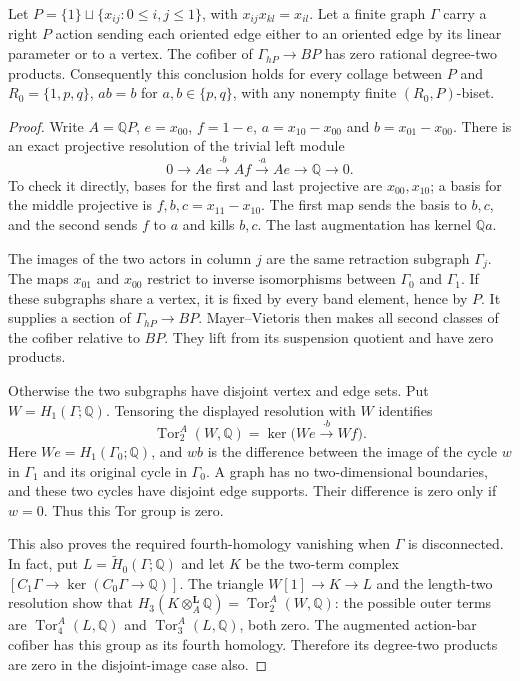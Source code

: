 \begin{lemma}
\label{CP2:A-high-P5-graph}
Let $P=\{1\}\sqcup\{x_{ij}:0\leq i,j\leq1\}$, with
$x_{ij}x_{kl}=x_{il}$.  Let a finite graph $\Gamma$ carry a
right $P$ action sending each oriented edge either to an
oriented edge by its linear parameter or to a vertex.
The cofiber of $\Gamma_{hP}\to BP$ has zero rational
degree-two products.  Consequently this conclusion holds
for every collage between $P$ and
$R_0=\{1,p,q\}$, $ab=b$ for $a,b\in\{p,q\}$,
with any nonempty finite $(R_0,P)$-biset.
\end{lemma}
\begin{proof}
Write $A=\mathbb QP$, $e=x_{00}$, $f=1-e$,
$a=x_{10}-x_{00}$ and $b=x_{01}-x_{00}$.  There is an exact
projective resolution of the trivial left module
\[
 0\longrightarrow Ae\xrightarrow{\cdot b}Af
   \xrightarrow{\cdot a}Ae\longrightarrow\mathbb Q
   \longrightarrow0.
\]
To check it directly, bases for the first and last projective
are $x_{00},x_{10}$; a basis for the middle projective is
$f,b,c=x_{11}-x_{10}$.  The first map sends the basis to
$b,c$, and the second sends $f$ to $a$ and kills $b,c$.
The last augmentation has kernel $\mathbb Qa$.

The images of the two actors in column $j$ are the same
retraction subgraph $\Gamma_j$.  The maps $x_{01}$ and
$x_{00}$ restrict to inverse isomorphisms between
$\Gamma_0$ and $\Gamma_1$.  If these subgraphs share a
vertex, it is fixed by every band element, hence by $P$.
It supplies a section of $\Gamma_{hP}\to BP$.
Mayer--Vietoris then makes all second classes of the
cofiber relative to $BP$.  They lift from its suspension
quotient and have zero products.

Otherwise the two subgraphs have disjoint vertex and edge
sets.  Put $W=H_1(\Gamma;\mathbb Q)$.  Tensoring the
displayed resolution with $W$ identifies
\[
 \operatorname{Tor}_2^A(W,\mathbb Q)
   =\ker\bigl(We\xrightarrow{\cdot b}Wf\bigr).
\]
Here $We=H_1(\Gamma_0;\mathbb Q)$, and $wb$ is the
difference between the image of the cycle $w$ in
$\Gamma_1$ and its original cycle in $\Gamma_0$.
A graph has no two-dimensional boundaries, and these
two cycles have disjoint edge supports.  Their difference
is zero only if $w=0$.  Thus this Tor group is zero.

This also proves the required fourth-homology vanishing
when $\Gamma$ is disconnected.  In fact, put
$L=\widetilde H_0(\Gamma;\mathbb Q)$ and let $K$ be the
two-term complex
$[C_1\Gamma\to\ker(C_0\Gamma\to\mathbb Q)]$.
The triangle $W[1]\to K\to L$ and the length-two
resolution show that $H_3(K\otimes_A^{\mathbf L}\mathbb Q)
=\operatorname{Tor}_2^A(W,\mathbb Q)$: the possible
outer terms are $\operatorname{Tor}_4^A(L,\mathbb Q)$
and $\operatorname{Tor}_3^A(L,\mathbb Q)$, both zero.
The augmented action-bar cofiber has this group as its
fourth homology.  Therefore its degree-two products are
zero in the disjoint-image case also.


\end{proof}

